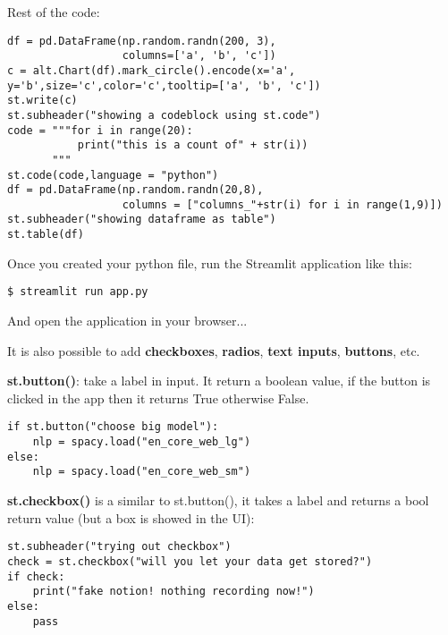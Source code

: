 \documentclass{beamer}[10pt, usepdftitle=false handout]
\begin{document}
\begin{frame}[fragile]
Rest of the code:
\vspace*{0.6em}

\begingroup
\fontsize{6pt}{8pt}\selectfont
\begin{verbatim}
df = pd.DataFrame(np.random.randn(200, 3),
                  columns=['a', 'b', 'c'])
c = alt.Chart(df).mark_circle().encode(x='a', y='b',size='c',color='c',tooltip=['a', 'b', 'c'])
st.write(c)
st.subheader("showing a codeblock using st.code")
code = """for i in range(20):
           print("this is a count of" + str(i))
       """
st.code(code,language = "python")
df = pd.DataFrame(np.random.randn(20,8),
                  columns = ["columns_"+str(i) for i in range(1,9)])
st.subheader("showing dataframe as table")
st.table(df)
\end{verbatim}
\endgroup

Once you created your python file, run the Streamlit application like this:
\vspace*{0.6em}

\begin{verbatim}
$ streamlit run app.py
\end{verbatim}

And open the application in your browser...

\end{frame}
\begin{frame}[fragile]
It is also possible to add \textbf{checkboxes}, \textbf{radios}, \textbf{text inputs}, \textbf{buttons}, etc. 
\vspace*{0.6em}

\textbf{st.button()}: take a label in input. It return a boolean value, if the button is clicked in the app then it returns True otherwise False.
\vspace*{0.6em}

\begin{verbatim}
if st.button("choose big model"):
    nlp = spacy.load("en_core_web_lg")
else:
    nlp = spacy.load("en_core_web_sm")
\end{verbatim}

\end{frame}
\begin{frame}[fragile]
\textbf{st.checkbox()} is a similar to st.button(), it takes a label and returns a bool return value (but a box is showed in the UI):

\begin{verbatim}
st.subheader("trying out checkbox")
check = st.checkbox("will you let your data get stored?") 
if check:
    print("fake notion! nothing recording now!")
else:
    pass
\end{verbatim}

\end{frame}
\end{document}
